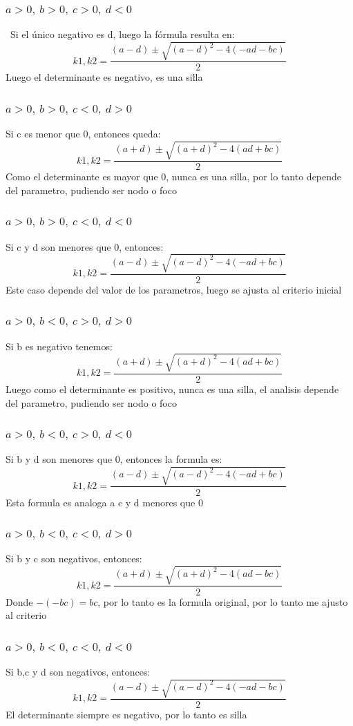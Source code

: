 \documentclass[a4paper, 10pt]{article}
\begin{document}
\subsubsection{$a>0,\ b>0,\ c>0,\ d<0$} 
\ Si el único negativo es d, luego la fórmula resulta en:
$$ k1,k2 = \frac{(a-d) \pm \sqrt{(a-d)^2 -4(-ad - bc)} }{2}$$
Luego el determinante es negativo, es una silla
\subsubsection{$a>0,\ b>0,\ c<0,\ d>0$}
Si c es menor que 0, entonces queda:
$$ k1,k2 = \frac{(a+d) \pm \sqrt{(a+d)^2 -4(ad + bc)} }{2}$$
Como el determinante es mayor que 0, nunca es una silla, por lo tanto depende del parametro, pudiendo ser nodo o foco
\subsubsection{$a>0,\ b>0,\ c<0,\ d<0$} 
Si c y d son menores que 0, entonces:
$$ k1,k2 = \frac{(a-d) \pm \sqrt{(a-d)^2 -4(-ad +bc)} }{2}$$
Este caso depende del valor de los parametros, luego se ajusta al criterio inicial
\subsubsection{$a>0,\ b<0,\ c>0,\ d>0$}
Si b es negativo tenemos:
$$ k1,k2 = \frac{(a+d) \pm \sqrt{(a+d)^2 -4(ad + bc)} }{2}$$
Luego como el determinante es positivo, nunca es una silla, el analisis depende del parametro, pudiendo ser nodo o foco
\subsubsection{$a>0,\ b<0,\ c>0,\ d<0$}
Si b y d son menores que 0, entonces la formula es:
$$ k1,k2 = \frac{(a-d) \pm \sqrt{(a-d)^2 -4(-ad + bc)} }{2}$$
Esta formula es analoga a c y d menores que 0
\subsubsection{$a>0,\ b<0,\ c<0,\ d>0$} 
Si b y c son negativos, entonces:
 $$ k1,k2 = \frac{(a+d) \pm \sqrt{(a+d)^2 -4(ad - bc)}}{2}$$
Donde  $-(-bc)=bc$, por lo tanto es la formula original, por  lo tanto me ajusto al criterio
\subsubsection{$a>0,\ b<0,\ c<0,\ d<0$} 
Si b,c y d son negativos, entonces:
$$ k1,k2 = \frac{(a-d) \pm \sqrt{(a-d)^2 -4(-ad - bc)}}{2}$$
El determinante siempre es negativo, por lo tanto es silla
\end{document}
